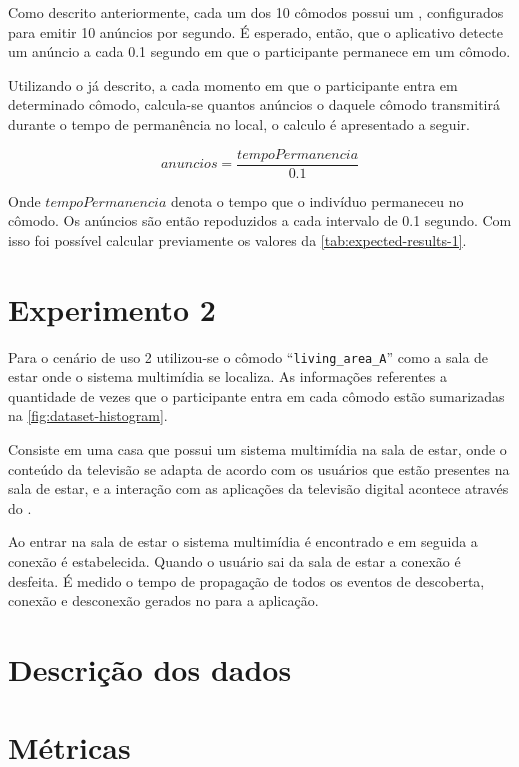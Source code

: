 Como descrito anteriormente, cada um dos 10 cômodos possui um \beacon{} \ble{}, configurados para emitir 10 anúncios por segundo. É esperado, então,  que o aplicativo detecte um anúncio a cada 0.1 segundo em que o participante permanece em um cômodo. 

Utilizando o \dataset{} já descrito, a cada momento em que o participante entra em determinado cômodo, calcula-se quantos anúncios o \beacon{} daquele cômodo transmitirá durante o tempo de permanência no local, o calculo é apresentado a seguir.

\begin{equation}
	anuncios = \frac{tempoPermanencia}{0.1} 
\end{equation}

Onde $tempoPermanencia$ denota o tempo que o indivíduo permaneceu no cômodo. Os anúncios são então repoduzidos a cada intervalo de 0.1 segundo. Com isso foi possível calcular previamente os valores da \autoref{tab:expected-results-1}.

\section{Experimento 2}

Para o cenário de uso 2 utilizou-se o cômodo ``\texttt{living\_area\_A}'' como a sala de estar onde o sistema multimídia se localiza. As informações referentes a quantidade de vezes que o participante entra em cada cômodo estão sumarizadas na \autoref{fig:dataset-histogram}.

Consiste em uma casa que possui um sistema multimídia na sala de estar, onde o conteúdo da televisão se adapta de acordo com os usuários que estão presentes na sala de estar, e a interação com as aplicações da televisão digital acontece através do \smartphone{}.

Ao entrar na sala de estar o sistema multimídia é encontrado e em seguida a conexão é estabelecida. Quando o usuário sai da sala de estar a conexão é desfeita. É medido o tempo de propagação de todos os eventos de descoberta, conexão e desconexão gerados no \stwopa{} para a aplicação.

\section{Descrição dos dados}

\section{Métricas}


